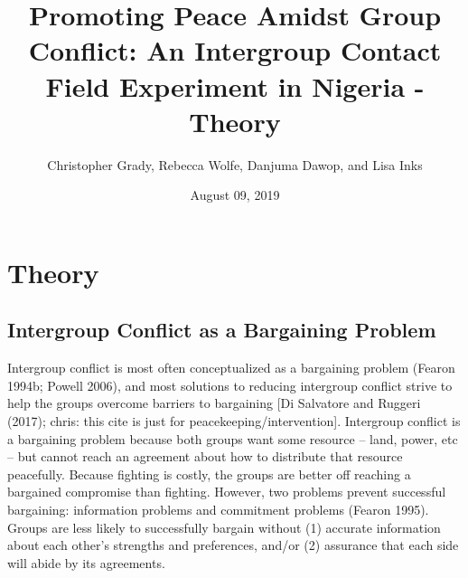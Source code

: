 \documentclass[11pt]{article}
\title{Promoting Peace Amidst Group Conflict: An Intergroup Contact Field
Experiment in Nigeria - Theory}
\author{
Christopher Grady, Rebecca Wolfe, Danjuma Dawop, and Lisa Inks
}
\date{August 09, 2019}
\begin{document}
\VerbatimFootnotes

%
%
%
%
%
%
%
%
%
%

\maketitle

\hypertarget{theory}{%
\section{Theory}\label{theory}}

\hypertarget{intergroup-conflict-as-a-bargaining-problem}{%
\subsection{Intergroup Conflict as a Bargaining
Problem}\label{intergroup-conflict-as-a-bargaining-problem}}

Intergroup conflict is most often conceptualized as a bargaining problem
(Fearon 1994b; Powell 2006), and most solutions to reducing intergroup
conflict strive to help the groups overcome barriers to bargaining {[}Di
Salvatore and Ruggeri (2017); chris: this cite is just for
peacekeeping/intervention{]}. Intergroup conflict is a bargaining
problem because both groups want some resource -- land, power, etc --
but cannot reach an agreement about how to distribute that resource
peacefully. Because fighting is costly, the groups are better off
reaching a bargained compromise than fighting. However, two problems
prevent successful bargaining: information problems and commitment
problems (Fearon 1995). Groups are less likely to successfully bargain
without (1) accurate information about each other's strengths and
preferences, and/or (2) assurance that each side will abide by its
agreements.
\end{document}
